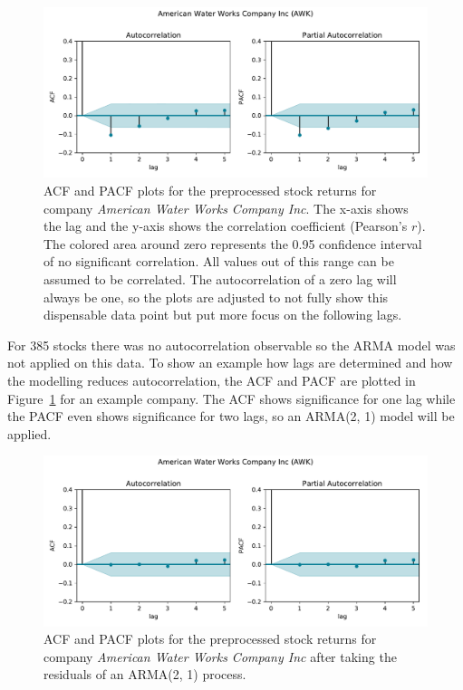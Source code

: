 \begin{figure}[!ht]
    \centering
    \includegraphics[width=\textwidth]{figures/regression/acf-awk-normed.pdf}
    \caption{ACF and PACF plots for the preprocessed stock returns for company \emph{American Water Works Company Inc}. The x-axis shows the lag and the y-axis shows the correlation coefficient (Pearson's $r$). The colored area around zero represents the 0.95 confidence interval of no significant correlation. All values out of this range can be assumed to be correlated. The autocorrelation of a zero lag will always be one, so the plots are adjusted to not fully show this dispensable data point but put more focus on the following lags.}
    \label{fig:acf_pacf_awk_normed}
\end{figure}

For 385 stocks there was no autocorrelation observable so the ARMA model was not applied on this data. To show an example how lags are determined and how the modelling reduces autocorrelation, the ACF and PACF are plotted in Figure~\ref{fig:acf_pacf_awk_normed} for an example company. The ACF shows significance for one lag while the PACF even shows significance for two lags, so an ARMA(2, 1) model will be applied.

\begin{figure}[!ht]
    \centering
    \includegraphics[width=\textwidth]{figures/regression/acf-awk-resid.pdf}
    \caption{ACF and PACF plots for the preprocessed stock returns for company \emph{American Water Works Company Inc} after taking the residuals of an ARMA(2, 1) process.}
    \label{fig:acf_pacf_awk_resid}
\end{figure}

